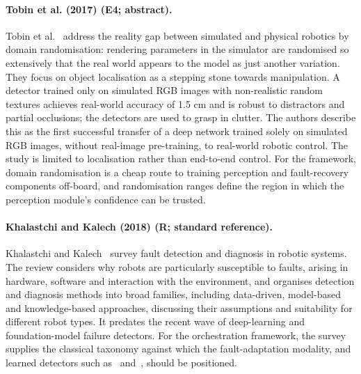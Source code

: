 \documentclass[10pt,a4paper]{article}
\begin{document}
\paragraph{Tobin et al. (2017) (E4; abstract).} Tobin et al.~\cite{Tobin2017} address the reality gap between simulated and physical robotics by domain randomisation: rendering parameters in the simulator are randomised so extensively that the real world appears to the model as just another variation. They focus on object localisation as a stepping stone towards manipulation. A detector trained only on simulated RGB images with non-realistic random textures achieves real-world accuracy of 1.5 cm and is robust to distractors and partial occlusions; the detectors are used to grasp in clutter. The authors describe this as the first successful transfer of a deep network trained solely on simulated RGB images, without real-image pre-training, to real-world robotic control. The study is limited to localisation rather than end-to-end control. For the framework, domain randomisation is a cheap route to training perception and fault-recovery components off-board, and randomisation ranges define the region in which the perception module's confidence can be trusted.

\paragraph{Khalastchi and Kalech (2018) (R; standard reference).} Khalastchi and Kalech~\cite{Khalastchi2018} survey fault detection and diagnosis in robotic systems. The review considers why robots are particularly susceptible to faults, arising in hardware, software and interaction with the environment, and organises detection and diagnosis methods into broad families, including data-driven, model-based and knowledge-based approaches, discussing their assumptions and suitability for different robot types. It predates the recent wave of deep-learning and foundation-model failure detectors. For the orchestration framework, the survey supplies the classical taxonomy against which the fault-adaptation modality, and learned detectors such as~\cite{Agia2024} and~\cite{Xu2025}, should be positioned.
\end{document}
